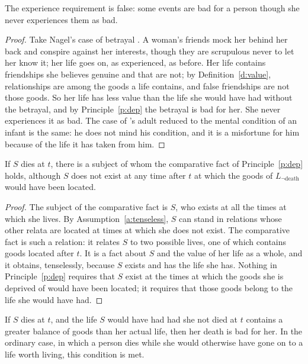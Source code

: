\documentclass{situationist-preprint}
\begin{document}
\begin{lemma}\label{l:exp}
The experience requirement is false: some events are bad for a person though she never experiences them as bad.
\end{lemma}

\begin{proof}
Take Nagel's case of betrayal \citep{Nagel1970}. A woman's friends mock her behind her back and conspire against her interests, though they are scrupulous never to let her know it; her life goes on, as experienced, as before. Her life contains friendships she believes genuine and that are not; by Definition~\ref{d:value}, relationships are among the goods a life contains, and false friendships are not those goods. So her life has less value than the life she would have had without the betrayal, and by Principle~\ref{p:dep} the betrayal is bad for her. She never experiences it as bad. The case of \citet{Nagel1970}'s adult reduced to the mental condition of an infant is the same: he does not mind his condition, and it is a misfortune for him because of the life it has taken from him.
\end{proof}

\begin{lemma}\label{l:subject}
If $S$ dies at $t$, there is a subject of whom the comparative fact of Principle~\ref{p:dep} holds, although $S$ does not exist at any time after $t$ at which the goods of $L_{\neg\text{death}}$ would have been located.
\end{lemma}

\begin{proof}
The subject of the comparative fact is $S$, who exists at all the times at which she lives. By Assumption~\ref{a:tenseless}, $S$ can stand in relations whose other relata are located at times at which she does not exist. The comparative fact is such a relation: it relates $S$ to two possible lives, one of which contains goods located after $t$. It is a fact about $S$ and the value of her life as a whole, and it obtains, tenselessly, because $S$ exists and has the life she has. Nothing in Principle~\ref{p:dep} requires that $S$ exist at the times at which the goods she is deprived of would have been located; it requires that those goods belong to the life she would have had.
\end{proof}

\begin{theorem}\label{t:main}
If $S$ dies at $t$, and the life $S$ would have had had she not died at $t$ contains a greater balance of goods than her actual life, then her death is bad for her. In the ordinary case, in which a person dies while she would otherwise have gone on to a life worth living, this condition is met.
\end{theorem}
\end{document}

